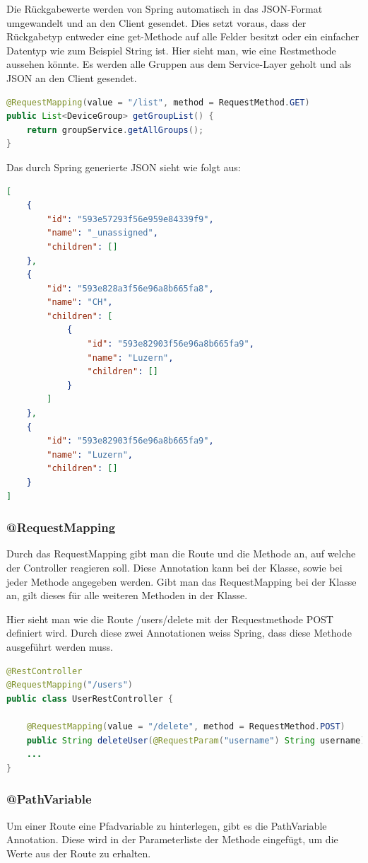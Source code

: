 Die Rückgabewerte werden von Spring automatisch in das JSON-Format umgewandelt und an den Client gesendet. Dies setzt voraus, dass der Rückgabetyp entweder eine get-Methode auf alle Felder besitzt oder ein einfacher Datentyp wie zum Beispiel String ist.
Hier sieht man, wie eine Restmethode aussehen könnte. Es werden alle Gruppen aus dem Service-Layer geholt und als JSON an den Client gesendet.
\begin{lstlisting}[language=java]
@RequestMapping(value = "/list", method = RequestMethod.GET)
public List<DeviceGroup> getGroupList() {
	return groupService.getAllGroups();
}
\end{lstlisting}

Das durch Spring generierte JSON sieht wie folgt aus:
\begin{lstlisting}[language=json]
[
    {
        "id": "593e57293f56e959e84339f9",
        "name": "_unassigned",
        "children": []
    },
    {
        "id": "593e828a3f56e96a8b665fa8",
        "name": "CH",
        "children": [
            {
                "id": "593e82903f56e96a8b665fa9",
                "name": "Luzern",
                "children": []
            }
        ]
    },
    {
        "id": "593e82903f56e96a8b665fa9",
        "name": "Luzern",
        "children": []
    }
]
\end{lstlisting}

\subsubsection{@RequestMapping}
Durch das RequestMapping gibt man die Route und die Methode an, auf welche der Controller reagieren soll. Diese Annotation kann bei der Klasse, sowie bei jeder Methode angegeben werden. Gibt man das RequestMapping bei der Klasse an, gilt dieses für alle weiteren Methoden in der Klasse.

Hier sieht man wie die Route /users/delete mit der Requestmethode POST definiert wird. Durch diese zwei Annotationen weiss Spring, dass diese Methode ausgeführt werden muss.
\begin{lstlisting}[language=java]
@RestController
@RequestMapping("/users")
public class UserRestController {

	@RequestMapping(value = "/delete", method = RequestMethod.POST)
	public String deleteUser(@RequestParam("username") String username) {}
	...
}
\end{lstlisting}
\subsubsection{@PathVariable}
Um einer Route eine Pfadvariable zu hinterlegen, gibt es die PathVariable Annotation. Diese wird in der Parameterliste der Methode eingefügt, um die Werte aus der Route zu erhalten.

